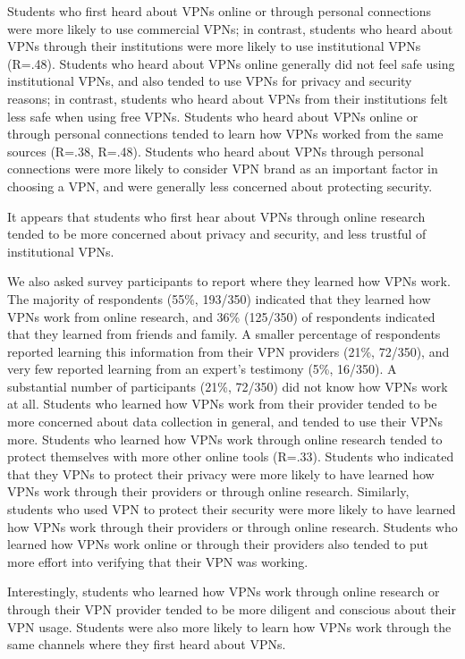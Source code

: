 Students who first heard about VPNs online or through personal connections
were more likely to use commercial VPNs; in contrast, students who heard about
VPNs through their institutions were more likely to use institutional VPNs
(R=.48). Students who heard about VPNs online generally did not feel safe
using institutional VPNs, and also tended to use VPNs for privacy and security
reasons; in contrast, students who heard about VPNs from their institutions
felt less safe when using free VPNs. Students who heard about VPNs online or
through personal connections tended to learn how VPNs worked from the same
sources (R=.38, R=.48). Students who heard about VPNs through personal
connections were more likely to consider VPN brand as an important factor in
choosing a VPN, and were generally less concerned about protecting security.

It appears that students who first hear about VPNs through online research
tended to be more concerned about privacy and security, and less trustful of
institutional VPNs. 

We also asked survey participants to report where they learned how VPNs work.
The majority of respondents (55\%, 193/350) indicated that they learned how
VPNs work from online research, and 36\% (125/350) of respondents indicated
that they learned from friends and family. A smaller percentage of respondents
reported learning this information from their VPN providers (21\%, 72/350),
and very few reported learning from an expert’s testimony (5\%, 16/350). A
substantial number of participants (21\%, 72/350) did not know how VPNs work
at all.  Students who learned how VPNs work from their provider tended to be
more concerned about data collection in general, and tended to use their VPNs
more. Students who learned how VPNs work through online research tended to
protect themselves with more other online tools (R=.33). Students who
indicated that they VPNs to protect their privacy were more likely to have
learned how VPNs work through their providers or through online research.
Similarly, students who used VPN to protect their security were more likely to
have learned how VPNs work through their providers or through online research.
Students who learned how VPNs work online or through their providers also
tended to put more effort into verifying that their VPN was working.

Interestingly, students who learned how VPNs work through online research or
through their VPN provider tended to be more diligent and conscious about
their VPN usage. Students were also more likely to learn how VPNs work through
the same channels where they first heard about VPNs.

